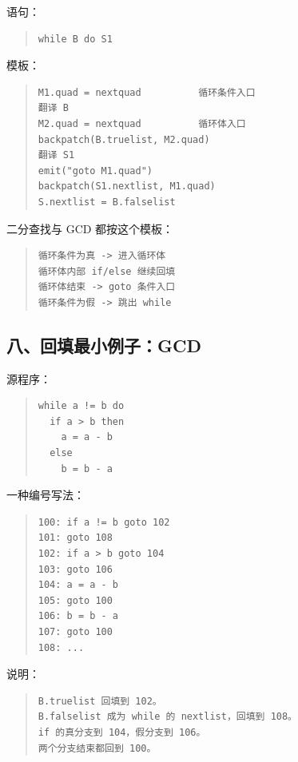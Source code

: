 \documentclass[UTF8,zihao=-4]{ctexart}
\begin{document}
语句：


\begin{quote}
\footnotesize
\begin{verbatim}
while B do S1
\end{verbatim}
\end{quote}


模板：


\begin{quote}
\footnotesize
\begin{verbatim}
M1.quad = nextquad          循环条件入口
翻译 B
M2.quad = nextquad          循环体入口
backpatch(B.truelist, M2.quad)
翻译 S1
emit("goto M1.quad")
backpatch(S1.nextlist, M1.quad)
S.nextlist = B.falselist
\end{verbatim}
\end{quote}


二分查找与 GCD 都按这个模板：


\begin{quote}
\footnotesize
\begin{verbatim}
循环条件为真 -> 进入循环体
循环体内部 if/else 继续回填
循环体结束 -> goto 条件入口
循环条件为假 -> 跳出 while
\end{verbatim}
\end{quote}


\subsection{八、回填最小例子：GCD}


源程序：


\begin{quote}
\footnotesize
\begin{verbatim}
while a != b do
  if a > b then
    a = a - b
  else
    b = b - a
\end{verbatim}
\end{quote}


一种编号写法：


\begin{quote}
\footnotesize
\begin{verbatim}
100: if a != b goto 102
101: goto 108
102: if a > b goto 104
103: goto 106
104: a = a - b
105: goto 100
106: b = b - a
107: goto 100
108: ...
\end{verbatim}
\end{quote}


说明：


\begin{quote}
\footnotesize
\begin{verbatim}
B.truelist 回填到 102。
B.falselist 成为 while 的 nextlist，回填到 108。
if 的真分支到 104，假分支到 106。
两个分支结束都回到 100。
\end{verbatim}
\end{quote}
\end{document}
